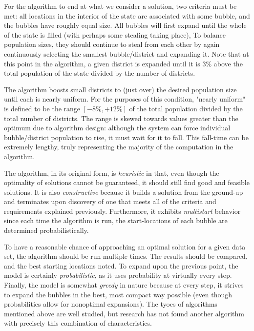 \documentclass[11pt]{article}				%
\begin{document}
For the algorithm to end at what we consider a solution, two criteria
must be met: all locations in the interior of the state are associated
with some bubble, and the bubbles have roughly equal size. All bubbles
will first expand until the whole of the state is filled (with perhaps
some stealing taking place), To balance population sizes, they should
continue to steal from each other by again continuously selecting the
smallest bubble/district and expanding it. Note that at this point in the 
algorithm, a given district is expanded until it is 3\% above the total
population of the state divided by the number of districts.

The algorithm boosts small districts to (just over) the desired
population size until each is nearly uniform. For the purposes of this
condition, "nearly uniform" is defined to be the range ${\left[-8\%
,+12\% \right]}$ of the total population divided by the total number of
districts. The range is skewed towards values greater than the optimum
due to algorithm design: although the system can force individual
bubble/district population to rise, it must wait for it to fall. This
fall-time can be extremely lengthy, truly representing the majority of
the computation in the algorithm.

The algorithm, in its original form, is \textit{heuristic} in that, even
though the optimality of solutions cannot be guaranteed, it should still
find good and feasible solutions. It is also \textit{constructive}
because it builds a solution from the ground-up and terminates upon
discovery of one that meets all of the criteria and requirements
explained previously. Furthermore, it exhibits \textit{multistart}
behavior since each time the algorithm is run, the start-locations of
each bubble are determined probabilistically.

To have a reasonable chance of approaching an optimal solution for a
given data set, the algorithm should be run multiple times. The results
should be compared, and the best starting locations noted. To expand upon 
the previous point, the model is certainly \textit{probabilistic}, as it
uses probability at virtually every step. Finally, the model is somewhat
\textit{greedy} in nature because at every step, it strives to expand the 
bubbles in the best, most compact way possible (even though probabilities 
allow for nonoptimal expansions). The tyoes of algorithms mentioned above 
are well studied, but research has not found another algorithm with
precisely this combination of characteristics.
\end{document}
